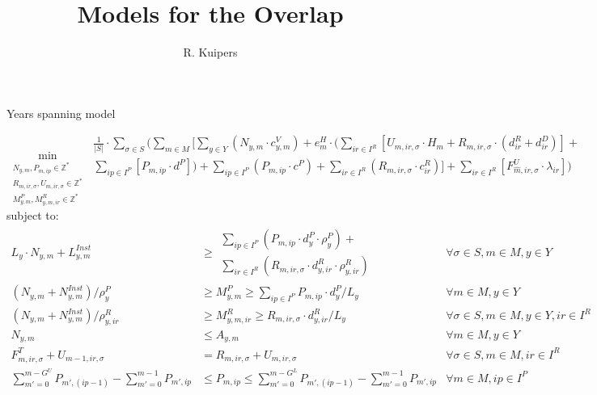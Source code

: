 \documentclass{beamer}
\title[Models for the Overlap]{Models for the Overlap}
\author{R. Kuipers}
\newcommand{\smalld}{\tiny}
\begin{document}
\begin{frame}{Years spanning model}
\smalld

\begin{equation}
	\min_{\substack{N_{y,m}, P_{m,ip} \in \mathbb{Z}^* \\ 
	R_{m,ir,\sigma}, U_{m,ir,\sigma} \in \mathbb{Z}^*  \\
	M^P_{y, m}, M^R_{y, m, ir} \in \mathbb{Z}^*}}
	\begin{aligned}
	\frac{1}{|S|} \cdot \sum_{\sigma \in S} ( \sum_{m \in M} [ 
	\sum_{y \in Y} (N_{y,m} \cdot c^V_{y,m}) +  
	e^H_m \cdot (\sum_{ir \in I^R}[U_{m,ir,\sigma} \cdot H_m + 
	R_{m,ir,\sigma} \cdot (d^R_{ir} + d^D_{ir})] +\\
	\sum_{ip \in I^P} [P_{m,ip} \cdot d^P]) + 
	\sum_{ip \in I^P} (P_{m,ip} \cdot c^P) + \sum_{ir \in I^R} (R_{m,ir,\sigma} \cdot c^R_{ir})] + 
	\sum_{ir \in I^R} [F^U_{\hat{m}, ir, \sigma} \cdot \lambda_{ir}] )
	\end{aligned}	
\end{equation}
subject to:
\begin{align}
L_y \cdot N_{y,m} + L^{Inst}_{y,m}		&\geq		\begin{aligned}\sum_{ip \in I^P} (P_{m,ip} \cdot d^P_y \cdot \rho^P_y) +\\ 
									\sum_{ir\in I^R} (R_{m,ir,\sigma} \cdot d^R_{y, ir} \cdot \rho^R_{y, ir})\end{aligned}																												& \forall \sigma \in S, m \in M, y \in Y	\\
(N_{y,m} + N^{Inst}_{y,m}) / \rho^P_y	 &\geq	M^P_{y, m}	\geq 	\sum_{ip \in I^P} P_{m,ip} \cdot d^P_y / L_y																																& \forall m \in M, y \in Y 	\\
(N_{y,m} + N^{Inst}_{y,m}) / \rho^R_{y, ir} &\geq M^R_{y, m, ir}\geq 	R_{m,ir,\sigma} \cdot d^R_{y, ir} / L_y 																												& \forall \sigma \in S, m \in M, y \in Y, ir \in I^R \\
N_{y,m}						&\leq 		A_{y,m} 										& \forall m \in M, y \in Y 	\\
F^T_{m, ir, \sigma} + U_{m-1,ir,\sigma} 	&=		R_{m,ir,\sigma} + U_{m,ir,\sigma}						& \forall \sigma \in S, m \in M, ir \in I^R	\\
\sum_{m' = 0}^{m-G^U} P_{m',(ip-1)} - \sum_{m' = 0}^{m-1} P_{m',ip} 	&\leq P_{m,ip}	\leq 	\sum_{m' =  0}^{m-G^L} P_{m',(ip-1)} - \sum_{m' = 0}^{m-1} P_{m',ip}	
																				& \forall m \in M, ip \in I^P			
\end{align}

\end{frame}
\end{document}
